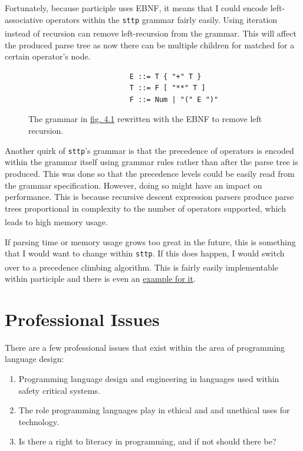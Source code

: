 \documentclass[]{full}
\theoremstyle{definition}
\begin{document}
Fortunately, because participle uses EBNF, it means that I could encode left-associative operators within the \verb|sttp| grammar fairly easily. Using iteration instead of recursion can remove left-recursion from the grammar\textsuperscript{\cite{pattis_2021}}. This will affect the produced parse tree as now there can be multiple children for matched for a certain operator's node.

\begin{figure}[H]
    \begin{center}
        \begin{verbatim}
                        E ::= T { "+" T }
                        T ::= F [ "**" T ]
                        F ::= Num | "(" E ")"
        \end{verbatim}
    \end{center}
    \vspace{-1.5em}
    \caption{\label{fig:4.2}The grammar in \hyperref[fig:4.1]{fig. 4.1} rewritten with the EBNF to remove left recursion.}
\end{figure}

Another quirk of \verb|sttp|'s grammar is that the precedence of operators is encoded within the grammar itself using grammar rules rather than after the parse tree is produced. This was done so that the precedence levels could be easily read from the grammar specification. However, doing so might have an impact on performance. This is because recursive descent expression parsers produce parse trees proportional in complexity to the number of operators supported, which leads to high memory usage\textsuperscript{\cite{bendersky_2012}}.

If parsing time or memory usage grows too great in the future, this is something that I would want to change within \verb|sttp|. If this does happen, I would switch over to a precedence climbing algorithm\textsuperscript{\cite{chu_2017}}. This is fairly easily implementable within participle and there is even an \href{https://github.com/alecthomas/participle/blob/master/_examples/precedenceclimbing/main.go}{example for it}.

\chapter{Professional Issues}
\label{chap:professional-issues}

There are a few professional issues that exist within the area of programming language design:

\begin{enumerate}
    \item Programming language design and engineering in languages used within safety critical systems.
    \item The role programming languages play in ethical and and unethical uses for technology.
    \item Is there a right to literacy in programming, and if not should there be?
\end{enumerate}
\end{document}
